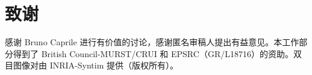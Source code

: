 \section*{致谢}

感谢 Bruno Caprile 进行有价值的讨论，感谢匿名审稿人提出有益意见。本工作部分得到了 British Council-MURST/CRUI 和 EPSRC（GR/L18716）的资助。双目图像对由 INRIA-Syntim 提供（版权所有）。
